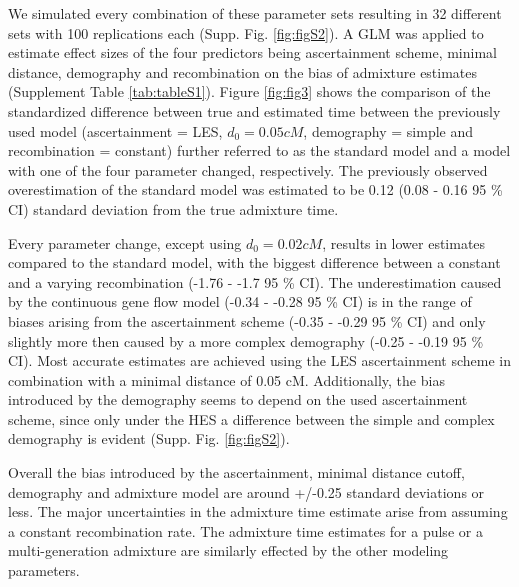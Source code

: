 \documentclass[]{article}
\begin{document}
We simulated every combination of these parameter sets resulting in 32
different sets with 100 replications each (Supp. Fig. \ref{fig:figS2}).
A GLM was applied to estimate effect sizes of the four predictors being
ascertainment scheme, minimal distance, demography and recombination on
the bias of admixture estimates (Supplement Table \ref{tab:tableS1}).
Figure \ref{fig:fig3} shows the comparison of the standardized
difference between true and estimated time between the previously used
model (ascertainment = LES, \(d_{0} = 0.05 cM\), demography = simple and
recombination = constant) further referred to as the standard model and
a model with one of the four parameter changed, respectively. The
previously observed overestimation of the standard model was estimated
to be 0.12 (0.08 - 0.16 95 \% CI) standard deviation from the true
admixture time.

Every parameter change, except using \(d_{0} = 0.02 cM\), results in lower estimates compared to the
standard model, with the biggest difference between a constant and a
varying recombination (-1.76 - -1.7 95 \% CI). The
underestimation caused by the continuous gene flow model (-0.34 -
-0.28 95 \% CI) is in the range of biases arising from the ascertainment scheme (-0.35 -
-0.29 95 \% CI) and only slightly more then caused by a more complex demography (-0.25 -
-0.19 95 \% CI). Most accurate estimates are achieved using the LES
ascertainment scheme in combination with a minimal distance of 0.05 cM.
Additionally, the bias introduced by the demography seems to depend on
the used ascertainment scheme, since only under the HES a difference
between the simple and complex demography is evident (Supp. Fig.
\ref{fig:figS2}).

Overall the bias introduced by the ascertainment, minimal distance
cutoff, demography and admixture model are  around +/-0.25 standard deviations or less. The major uncertainties in the admixture time
estimate arise from assuming a constant recombination rate. The
admixture time estimates for a pulse or a multi-generation admixture are similarly effected by the other modeling parameters.
\end{document}
